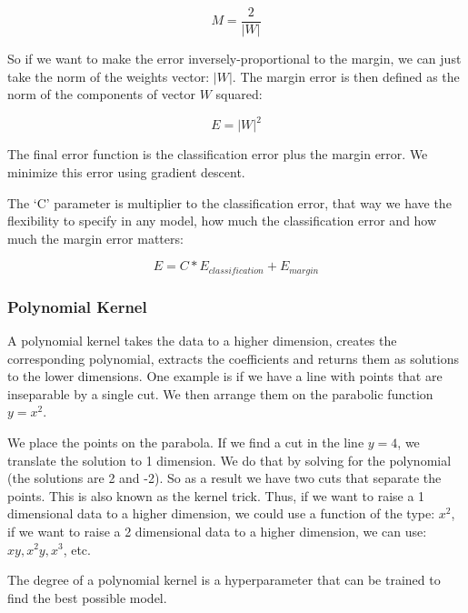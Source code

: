 \documentclass{article}
\begin{document}
\begin{equation}
  M = \frac{2}{|W|}
\end{equation}

So if we want to make the error inversely-proportional to the margin, we can just take the norm of the weights vector: $|W|$. The margin error is then defined as the norm of the components of vector $W$ squared:

\begin{equation}
  E = |W|^2
\end{equation}

The final error function is the classification error plus the margin error. We minimize this error using gradient descent.

The ‘C’ parameter is multiplier to the classification error, that way we have the flexibility to specify in any model, how much the classification error and how much the margin error matters:

\begin{equation}
  E = C * E_{classification} + E_{margin}
\end{equation}

\subsubsection{Polynomial Kernel}
A polynomial kernel takes the data to a higher dimension, creates the corresponding polynomial, extracts the coefficients and returns them as solutions to the lower dimensions. One example is if we have a line with points that are inseparable by a single cut. We then arrange them on the parabolic function $y = x^2$.

We place the points on the parabola. If we find a cut in the line $y = 4$, we translate the solution to 1 dimension. We do that by solving for the polynomial (the solutions are 2 and -2). So as a result we have two cuts that separate the points. This is also known as the kernel trick. Thus, if we want to raise a 1 dimensional data to a higher dimension, we could use a function of the type: $x^2$, if we want to raise a 2 dimensional data to a higher dimension, we can use: $xy, x^2y, x^3$, etc.

The degree of a polynomial kernel is a hyperparameter that can be trained to find the best possible model.
\end{document}

